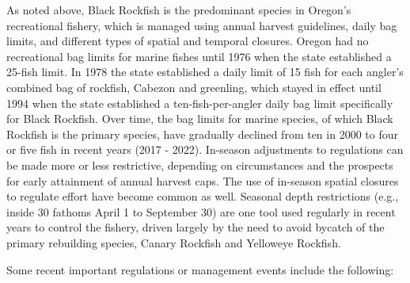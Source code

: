 \documentclass[11pt,
  english,
  letterpaper,
]{article}
\begin{document}
As noted above, Black Rockfish is the predominant species in Oregon's recreational fishery, which is managed using annual harvest guidelines, daily bag limits, and different types of spatial and temporal closures. Oregon had no recreational bag limits for marine fishes until 1976 when the state established a 25-fish limit. In 1978 the state established a daily limit of 15 fish for each angler's combined bag of rockfish, Cabezon and greenling, which stayed in effect until 1994 when the state established a ten-fish-per-angler daily bag limit specifically for Black Rockfish. Over time, the bag limits for marine species, of which Black Rockfish is the primary species, have gradually declined from ten in 2000 to four or five fish in recent years (2017 - 2022). In-season adjustments to regulations can be made more or less restrictive, depending on circumstances and the prospects for early attainment of annual harvest caps. The use of in-season spatial closures to regulate effort have become common as well. Seasonal depth restrictions (e.g., inside 30 fathoms April 1 to September 30) are one tool used regularly in recent years to control the fishery, driven largely by the need to avoid bycatch of the primary rebuilding species, Canary Rockfish and Yelloweye Rockfish.

Some recent important regulations or management events include the following:
\end{document}

